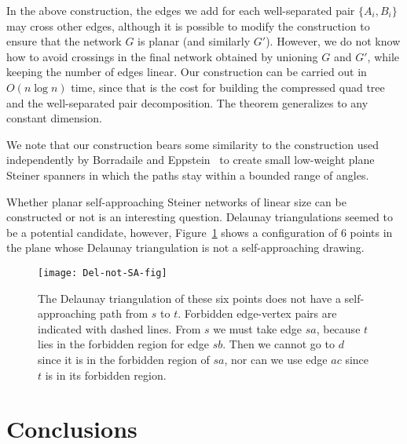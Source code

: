 \documentclass[11pt]{article}
\begin{document}
In the above construction, the edges
we add for each well-separated pair $\{A_i,B_i\}$ may cross other edges, although
it is possible to modify the construction to
ensure that the network $G$ is planar (and similarly $G'$).  However, we do not
know how to avoid crossings in the final network
obtained by unioning $G$ and $G'$, while keeping the number of edges linear.
Our construction can be carried out in $O(n \log n)$ time, since that is the cost for building the compressed quad tree and the  well-separated pair decomposition.  The theorem generalizes to any constant dimension.

We note that our construction bears some similarity to the construction used independently by Borradaile and Eppstein~\cite{Borradaile} to create small low-weight plane Steiner spanners in which the paths stay within a bounded range of angles.



Whether planar self-approaching Steiner networks of linear size can be constructed or not is an interesting question.
Delaunay triangulations seemed to be a potential candidate, however, Figure~\ref{fig:Del-not-SA} shows a configuration of 6 points in the plane whose Delaunay triangulation is not a self-approaching drawing.

\begin{figure}
\begin{center}
\texttt{[image: Del-not-SA-fig]}
\vspace{1cm}
\caption{The Delaunay triangulation of these six points does not have a self-approaching path from $s$ to $t$.  Forbidden edge-vertex pairs are indicated with dashed lines.  From $s$ we must take edge $sa$, because $t$ lies in the forbidden region for edge $sb$.   Then we cannot go to $d$ since it is in the forbidden region of $sa$, nor can we use edge $ac$ since $t$ is in its forbidden region.}
\label{fig:Del-not-SA}
\end{center}
\end{figure}
















\section{Conclusions}
\end{document}
